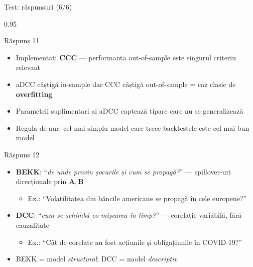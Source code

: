 \documentclass[9pt, aspectratio=169, t]{beamer}
\begin{document}
\begin{frame}{Test: răspunsuri (6/6)}
    \begin{cminipage}{0.95\textwidth}
    {\scriptsize
    \begin{exampleblock}{Răspuns 11}
        \begin{itemize}\setlength{\itemsep}{0pt}
            \item Implementați \textbf{CCC} --- performanța out-of-sample este singurul criteriu relevant
            \item aDCC câștigă in-sample dar CCC câștigă out-of-sample = caz clasic de \textbf{overfitting}
            \item Parametrii suplimentari ai aDCC captează tipare care nu se generalizează
            \item Regula de aur: cel mai simplu model care trece backtestele este cel mai bun model
        \end{itemize}
    \end{exampleblock}
    \begin{exampleblock}{Răspuns 12}
        \begin{itemize}\setlength{\itemsep}{0pt}
            \item \textbf{BEKK}: ``\textit{de unde provin șocurile și cum se propagă?}'' --- spillover-uri direcționale prin $\mathbf{A}, \mathbf{B}$
                \begin{itemize}\setlength{\itemsep}{0pt}
                    \item Ex.: ``Volatilitatea din băncile americane se propagă în cele europene?''
                \end{itemize}
            \item \textbf{DCC}: ``\textit{cum se schimbă co-mișcarea în timp?}'' --- corelație variabilă, fără cauzalitate
                \begin{itemize}\setlength{\itemsep}{0pt}
                    \item Ex.: ``Cât de corelate au fost acțiunile și obligațiunile în COVID-19?''
                \end{itemize}
            \item BEKK = model \textit{structural}; DCC = model \textit{descriptiv}
        \end{itemize}
    \end{exampleblock}
    }
    \end{cminipage}
\end{frame}

\end{document}
